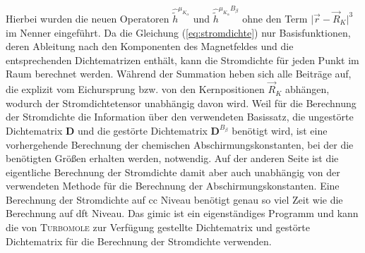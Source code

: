 	Hierbei wurden die neuen Operatoren $\hat{\tilde{h}}^{\mu_{K_\alpha}}$ und $\hat{\tilde{h}}^{\mu_{K_\alpha}B_\beta}$ ohne den Term $\vert\vec{r}-\vec{R}_K\vert^3$ im Nenner eingeführt. Da die Gleichung (\ref{eq:stromdichte}) nur Basisfunktionen, deren Ableitung nach den Komponenten des Magnetfeldes und die entsprechenden Dichtematrizen enthält, kann die Stromdichte für jeden Punkt im Raum berechnet werden. Während der Summation heben sich alle Beiträge auf, die explizit vom Eichursprung bzw. von den Kernpositionen $\vec{R}_K$ abhängen, wodurch der Stromdichtetensor unabhängig davon wird. Weil für die Berechnung der Stromdichte die Information über den verwendeten Basissatz, die ungestörte Dichtematrix $\boldsymbol D$ und die gestörte Dichtematrix $\boldsymbol{D}^{B_\beta}$ benötigt wird, ist eine vorhergehende Berechnung der chemischen Abschirmungskonstanten, bei der die benötigten Größen erhalten werden, notwendig. Auf der anderen Seite ist die eigentliche Berechnung der Stromdichte damit aber auch unabhängig von der verwendeten Methode für die Berechnung der Abschirmungskonstanten. Eine Berechnung der Stromdichte auf \ac{cc} Niveau benötigt genau so viel Zeit wie die Berechnung auf \ac{dft} Niveau. Das \ac{gimic} ist ein eigenständiges Programm und kann die von \textsc{Turbomole} zur Verfügung gestellte Dichtematrix und gestörte Dichtematrix für die Berechnung der Stromdichte verwenden. 